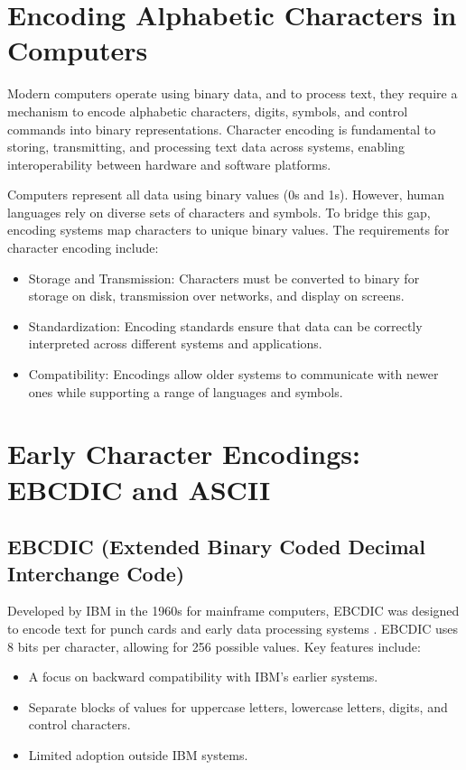 \section{Encoding Alphabetic Characters in Computers}
Modern computers operate using binary data, and to process text, they require a mechanism to encode alphabetic characters, digits, symbols, and control commands into binary representations. Character encoding is fundamental to storing, transmitting, and processing text data across systems, enabling interoperability between hardware and software platforms.

Computers represent all data using binary values (0s and 1s). However, human languages rely on diverse sets of characters and symbols. To bridge this gap, encoding systems map characters to unique binary values. The requirements for character encoding include:
\begin{itemize}
    \item Storage and Transmission: Characters must be converted to binary for storage on disk, transmission over networks, and display on screens.
    \item Standardization: Encoding standards ensure that data can be correctly interpreted across different systems and applications.
    \item Compatibility: Encodings allow older systems to communicate with newer ones while supporting a range of languages and symbols.
\end{itemize}

\section{Early Character Encodings: EBCDIC and ASCII}

\subsection{EBCDIC (Extended Binary Coded Decimal Interchange Code)}

Developed by IBM in the 1960s for mainframe computers, EBCDIC was designed to encode text for punch cards and early data processing systems \cite{ibm1964ebcdic}. EBCDIC uses 8 bits per character, allowing for 256 possible values. Key features include:
\begin{itemize}
    \item A focus on backward compatibility with IBM's earlier systems.
    \item Separate blocks of values for uppercase letters, lowercase letters, digits, and control characters.
    \item Limited adoption outside IBM systems.
\end{itemize}

